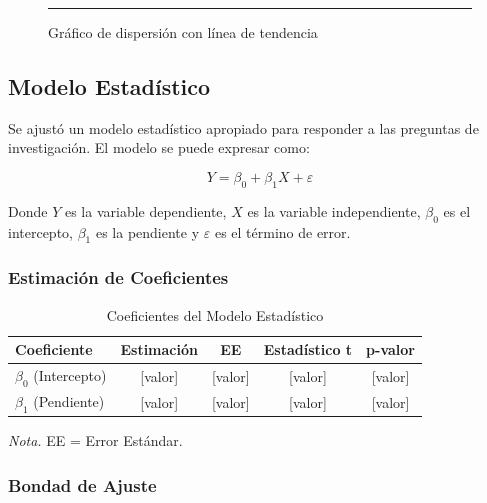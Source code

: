 \documentclass[12pt, letterpaper]{article}
\begin{document}
\begin{figure}[H]
    \centering
    \rule{8cm}{5cm} %
    \caption{Gráfico de dispersión con línea de tendencia}
    \label{fig:correlacion}
\end{figure}

\subsection{Modelo Estadístico}

Se ajustó un modelo estadístico apropiado para responder a las preguntas de investigación.
El modelo se puede expresar como:

\begin{equation}
    Y = \beta_0 + \beta_1 X + \varepsilon
    \label{eq:modelo}
\end{equation}

Donde $Y$ es la variable dependiente, $X$ es la variable independiente, $\beta_0$ es el
intercepto, $\beta_1$ es la pendiente y $\varepsilon$ es el término de error.

\subsubsection{Estimación de Coeficientes}

\begin{table}[H]
    \centering
    \caption{Coeficientes del Modelo Estadístico}
    \begin{tabular}{@{}lcccc@{}}
        \toprule
        \textbf{Coeficiente}   & \textbf{Estimación} & \textbf{EE} & \textbf{Estadístico t} & \textbf{p-valor} \\
        \midrule
        $\beta_0$ (Intercepto) & [valor]             & [valor]     & [valor]                & [valor]          \\
        $\beta_1$ (Pendiente)  & [valor]             & [valor]     & [valor]                & [valor]          \\
        \bottomrule
    \end{tabular}
    \label{tab:coeficientes}

    \vspace{0.2cm}
    \textit{Nota.} EE = Error Estándar.
\end{table}

\subsubsection{Bondad de Ajuste}
\end{document}
